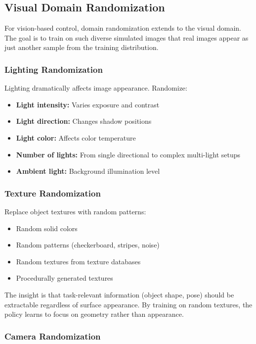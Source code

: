 \subsection{Visual Domain Randomization}

For vision-based control, domain randomization extends to the visual domain. The goal is to train on such diverse simulated images that real images appear as just another sample from the training distribution.

\subsubsection{Lighting Randomization}

Lighting dramatically affects image appearance. Randomize:
\begin{itemize}
    \item \textbf{Light intensity:} Varies exposure and contrast
    \item \textbf{Light direction:} Changes shadow positions
    \item \textbf{Light color:} Affects color temperature
    \item \textbf{Number of lights:} From single directional to complex multi-light setups
    \item \textbf{Ambient light:} Background illumination level
\end{itemize}

\subsubsection{Texture Randomization}

Replace object textures with random patterns:
\begin{itemize}
    \item Random solid colors
    \item Random patterns (checkerboard, stripes, noise)
    \item Random textures from texture databases
    \item Procedurally generated textures
\end{itemize}

The insight is that task-relevant information (object shape, pose) should be extractable regardless of surface appearance. By training on random textures, the policy learns to focus on geometry rather than appearance.

\subsubsection{Camera Randomization}

